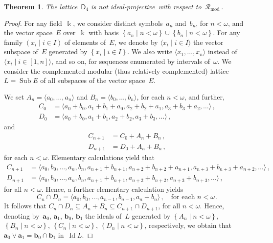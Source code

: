 \documentclass[reqno]{amsart}
\numberwithin{equation}{section}
\theoremstyle{plain}
\newtheorem{theorem}{Theorem}[section]
\theoremstyle{definition}
\theoremstyle{remark}
\numberwithin{figure}{section}
\numberwithin{table}{section}
\begin{document}
\begin{theorem}\label{T:D4NonIdProj}
The lattice~${\mathsf{D}_{4}}$ is not {i\-de\-al-pro\-jec\-tive}\ with respect to~${\mathcal{R}_{\mathrm{mod}}}$\,.
\end{theorem}

\begin{proof}
For any field~$\Bbbk$, we consider distinct symbols~$a_n$ and~$b_n$, for $n<{\omega}$, and the vector space~$E$ over~$\Bbbk$ with basis ${{\left\{{{{a_n}}\mid{{n<{\omega}}}}\right\}}}\cup{{\left\{{{{b_n}}\mid{{n<{\omega}}}}\right\}}}$.
For any family ${\left({{x_i}}\mid{{i\in I}}\right)}$ of elements of~$E$, we denote by ${\langle{{x_i}}\mid{{i\in I}}\rangle}$ the vector subspace of~$E$ generated by ${{\left\{{{{x_i}}\mid{{i\in I}}}\right\}}}$.
We also write ${\langle{{x_1,\dots,x_n}}\rangle}$ instead of ${\langle{{x_i}}\mid{{i\in[1,n]}}\rangle}$, and so on, for sequences enumerated by intervals of~${\omega}$.
We consider the complemented modular (thus relatively complemented) lattice $L=\operatorname{Sub} E$ of all subspaces of the vector space~$E$.

We set $A_n={\langle{{a_0,\dots,a_n}}\rangle}$ and $B_n={\langle{{b_0,\dots,b_n}}\rangle}$, for each $n<{\omega}$, and further,
 \begin{align*}
 C_0&={\langle{{a_0+b_0,a_1+b_1+a_0,a_2+b_2+a_1,
 a_3+b_3+a_2,\dots}}\rangle}\,,\\
 D_0&={\langle{{a_0+b_0,a_1+b_1,a_2+b_2,a_3+b_3,\dots}}\rangle}\,,
 \end{align*}
and
 \begin{align*}
 C_{n+1}&=C_0+A_n+B_n\,,\\
 D_{n+1}&=D_0+A_n+B_n\,, 
 \end{align*}
for each $n<{\omega}$.
Elementary calculations yield that
 \begin{align*}
 C_{n+1}&={\langle{{a_0,b_0,\dots,a_n,b_n,a_{n+1}+b_{n+1},
 a_{n+2}+b_{n+2}+a_{n+1},a_{n+3}+b_{n+3}+a_{n+2},\dots}}\rangle}\,,\\
 D_{n+1}&={\langle{{a_0,b_0,\dots,a_n,b_n,a_{n+1}+b_{n+1},
 a_{n+2}+b_{n+2},a_{n+3}+b_{n+3},\dots}}\rangle}\,, 
 \end{align*}
for all $n<{\omega}$.
Hence, a further elementary calculation yields
 \[
 C_n\cap D_n={\langle{{a_0,b_0,\dots,a_{n-1},b_{n-1},a_n+b_n}}\rangle}\,,
 \quad\text{for each }n<{\omega}\,.
 \]
It follows that $C_n\cap D_n\subseteq A_n+B_n\subseteq C_{n+1}\cap D_{n+1}$, for all $n<{\omega}$.
Hence, denoting by~${\boldsymbol{a}}_0$, ${\boldsymbol{a}}_1$, ${\boldsymbol{b}}_0$, ${\boldsymbol{b}}_1$ the ideals of~$L$ generated by ${{\left\{{{{A_n}}\mid{{n<{\omega}}}}\right\}}}$, ${{\left\{{{{B_n}}\mid{{n<{\omega}}}}\right\}}}$, ${{\left\{{{{C_n}}\mid{{n<{\omega}}}}\right\}}}$, ${{\left\{{{{D_n}}\mid{{n<{\omega}}}}\right\}}}$, respectively, we obtain that ${\boldsymbol{a}}_0\vee{\boldsymbol{a}}_1={\boldsymbol{b}}_0\cap{\boldsymbol{b}}_1$ in~$\operatorname{Id} L$.


\end{proof}
\end{document}
